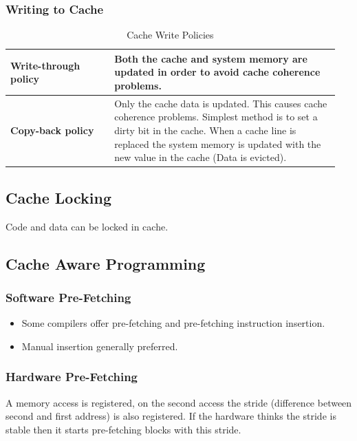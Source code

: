 		\subsubsection{Writing to Cache}
			\begin{table}[H]
				\centering
				\begin{tabular}{|p{0.3\linewidth}|p{0.65\linewidth}|}
					\hline
					\textbf{Write-through policy}
						& Both the cache and system memory are updated in order to avoid cache coherence problems.\\
					\hline
					\textbf{Copy-back policy}
						& Only the cache data is updated. This causes cache coherence problems. Simplest method is to set a dirty bit in the cache. When a cache line is replaced the system memory is updated with the new value in the cache (Data is evicted).\\
					\hline
				\end{tabular}
				\caption{Cache Write Policies}
			\end{table}
			
	\subsection{Cache Locking}
		Code and data can be locked in cache.
		
		
	\subsection{Cache Aware Programming}
		\subsubsection{Software Pre-Fetching }
			\begin{itemize}
			  \item Some compilers offer pre-fetching and pre-fetching instruction insertion.
			  \item Manual insertion generally preferred.
			\end{itemize}
			
		
		
		\subsubsection{Hardware Pre-Fetching }
			A memory access is registered, on the second access the stride (difference between second and first address) is also registered. If the hardware thinks the stride is stable then it starts pre-fetching blocks with this stride.
			
